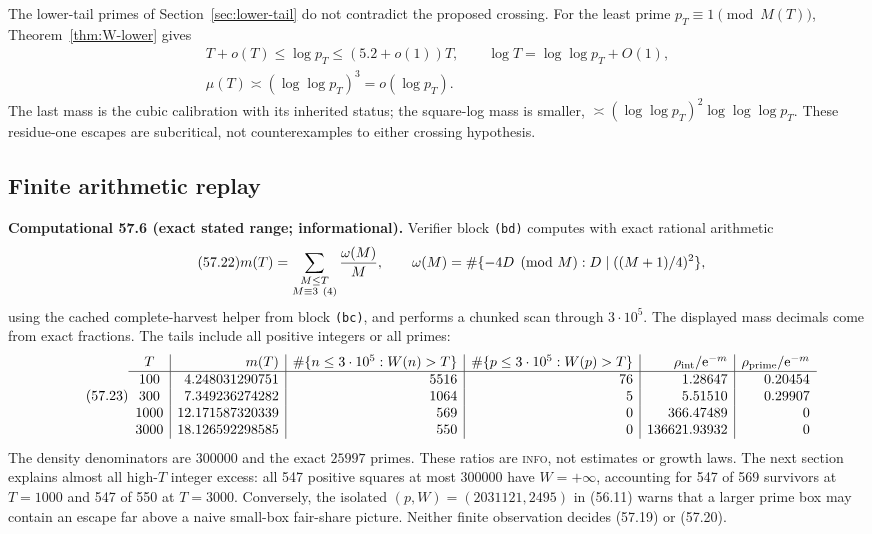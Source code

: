\documentclass[10pt,reqno]{amsart}
\theoremstyle{definition}
\newcommand{\e}{\mathrm e}
\newcommand{\1}{\mathbf 1}
\begin{document}
The lower-tail primes of Section~\ref{sec:lower-tail} do not contradict the
proposed crossing.  For the least prime $p_T\equiv1\pmod {M(T)}$,
Theorem~\ref{thm:W-lower} gives
\begin{equation}\tag{57.21}
 \begin{gathered}
 T+o(T)\leq\log p_T\leq(5.2+o(1))T,
 \qquad\log T=\log\log p_T+O(1),\\
 \mu(T)\asymp(\log\log p_T)^3=o(\log p_T).
 \end{gathered}
\end{equation}
The last mass is the cubic calibration with its inherited status; the
square-log mass is smaller,
$\asymp(\log\log p_T)^2\log\log\log p_T$.  These residue-one escapes are
subcritical, not counterexamples to either crossing hypothesis.

\subsection{Finite arithmetic replay}
\medskip\noindent\textbf{Computational 57.6 (exact stated range;
informational).}
Verifier block \texttt{(bd)} computes with exact rational arithmetic
\begin{equation}\tag{57.22}
 m(T)=\sum_{\substack{M\leq T\\M\equiv3\ (4)}}{\omega(M)\over M},
 \qquad
 \omega(M)=\#\{-4D\pmod M:D\mid((M+1)/4)^2\},
\end{equation}
using the cached complete-harvest helper from block \texttt{(bc)}, and
performs a chunked scan through $3\cdot10^5$.  The displayed mass decimals
come from exact fractions.  The tails include all positive integers or all
primes:
\begingroup
\tiny
\setlength{\arraycolsep}{2pt}
\begin{equation}\tag{57.23}
\begin{array}{c|r|r|r|r|r}
T&m(T)&\#\{n\leq3\cdot10^5:W(n)>T\}&
 \#\{p\leq3\cdot10^5:W(p)>T\}&
 \rho_{\rm int}/\e^{-m}&\rho_{\rm prime}/\e^{-m}\\ \hline
100 &4.248031290751&5516&76&1.28647&0.20454\\
300 &7.349236274282&1064&5&5.51510&0.29907\\
1000&12.171587320339&569&0&366.47489&0\\
3000&18.126592298585&550&0&136621.93932&0
\end{array}
\end{equation}
\endgroup
The density denominators are $300000$ and the exact $25997$ primes.  These
ratios are \textsc{info}, not estimates or growth laws.  The next section
explains almost all high-$T$ integer excess: all 547 positive squares at
most 300000 have $W=+\infty$, accounting for 547 of 569 survivors at
$T=1000$ and 547 of 550 at $T=3000$.  Conversely, the isolated
$(p,W)=(2031121,2495)$ in (56.11) warns that a larger prime box may contain
an escape far above a naive small-box fair-share picture.  Neither finite
observation decides (57.19) or (57.20).
\end{document}
